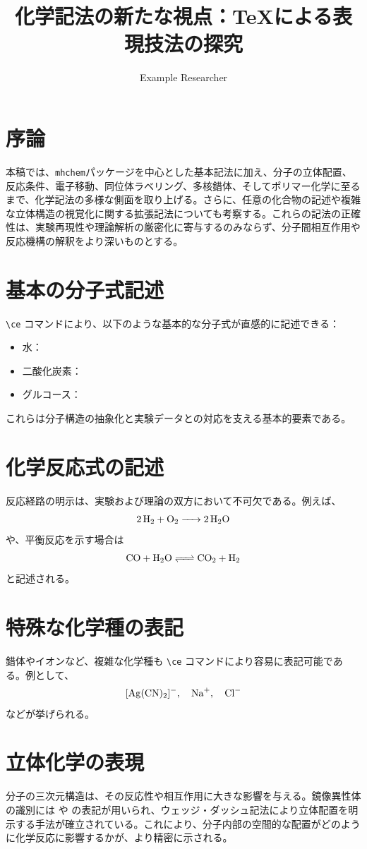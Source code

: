 \documentclass{ltjsarticle}
\begin{document}
\title{化学記法の新たな視点：\TeX による表現技法の探究}
\author{Example Researcher}
\maketitle

\section{序論}
本稿では、\texttt{mhchem}パッケージを中心とした基本記法に加え、分子の立体配置、反応条件、電子移動、同位体ラベリング、多核錯体、そしてポリマー化学に至るまで、化学記法の多様な側面を取り上げる。さらに、任意の化合物の記述や複雑な立体構造の視覚化に関する拡張記法についても考察する。これらの記法の正確性は、実験再現性や理論解析の厳密化に寄与するのみならず、分子間相互作用や反応機構の解釈をより深いものとする。

\section{基本の分子式記述}
\verb|\ce| コマンドにより、以下のような基本的な分子式が直感的に記述できる：
\begin{itemize}
  \item 水：
  \item 二酸化炭素：
  \item グルコース：
\end{itemize}
これらは分子構造の抽象化と実験データとの対応を支える基本的要素である。

\section{化学反応式の記述}
反応経路の明示は、実験および理論の双方において不可欠である。例えば、
\[
\ce{2H2 + O2 -> 2H2O}
\]
や、平衡反応を示す場合は
\[
\ce{CO + H2O <=> CO2 + H2}
\]
と記述される。

\section{特殊な化学種の表記}
錯体やイオンなど、複雑な化学種も \verb|\ce| コマンドにより容易に表記可能である。例として、
\[
\ce{[Ag(CN)2]^-}, \quad \ce{Na+}, \quad \ce{Cl-}
\]
などが挙げられる。

\section{立体化学の表現}
分子の三次元構造は、その反応性や相互作用に大きな影響を与える。鏡像異性体の識別には  や  の表記が用いられ、ウェッジ・ダッシュ記法により立体配置を明示する手法が確立されている。これにより、分子内部の空間的な配置がどのように化学反応に影響するかが、より精密に示される。
\end{document}
